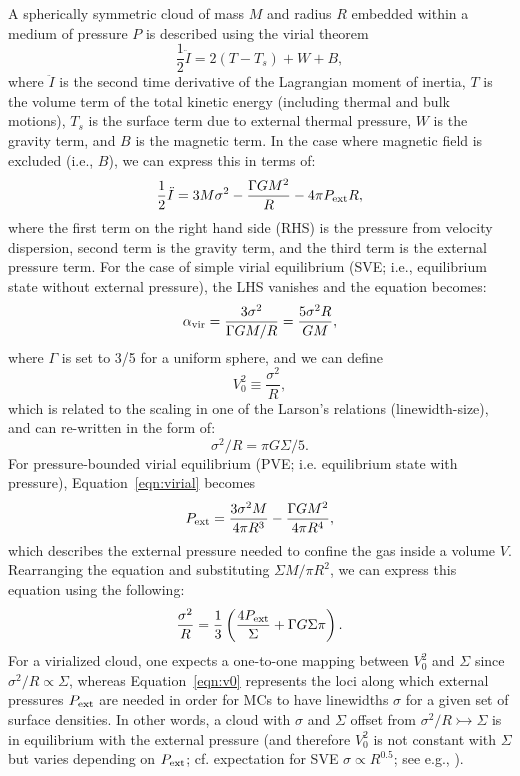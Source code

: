 \documentclass[apj]{emulateapj} %
\begin{document}
{%
A spherically symmetric cloud of mass $M$ and radius $R$ embedded within
a medium of pressure $P$ is described using the virial theorem
\begin{equation}
\frac{1}{2}\ddot I = 2(T - T_s) + W + B,
\end{equation}
where $\ddot I$ is the second time derivative of the Lagrangian moment of inertia,
$T$ is the volume term of the total kinetic energy (including thermal and
bulk motions), $T_s$ is the surface term due to external thermal pressure,
$W$ is the gravity term, and $B$ is the magnetic term.
In the case where magnetic field is excluded (i.e., $B$), we can express this in terms of:
\begin{equation}
\frac{1}{2}\ddot I = 3 M \sigma^2 - \frac{\Gamma GM^2}{R} - 4\pi P_{\rm ext} R,
\label{eqn:virial}
\end{equation}
where the first term on the right hand side (RHS) is the pressure from velocity dispersion, second
term is the gravity term, and the third term is the external pressure term.
For the case of simple virial equilibrium (SVE; i.e., equilibrium state without external pressure),
the LHS vanishes and the equation becomes:
\begin{equation}
\alpha_{\rm vir} = \frac{3\sigma^2}{\Gamma GM/R} = \frac{5\sigma^2R}{GM},
\end{equation}
where $\Gamma$ is set to 3/5 for a uniform sphere, and we can define
\begin{equation}
V_0^2\equiv\frac{\sigma^2}{R},
\end{equation}
which is related to the scaling in one of the Larson's relations (linewidth-size),
and can re-written in the form of:
\begin{equation}
\sigma^2/R = \pi G \Sigma/5.
\end{equation}
For pressure-bounded virial equilibrium (PVE; i.e. equilibrium state with pressure), Equation~\ref{eqn:virial} becomes
\begin{equation}
P_{\rm ext} = \frac{3\sigma^2M}{4\pi R^3} - \frac{\Gamma G M^2}{4\pi R^4},
\label{eqn:pext}
\end{equation}
which describes the external pressure needed to confine the gas inside a volume $V$.
Rearranging the equation and substituting $\Sigma$\eq$M/\pi R^2$, we can express
this equation using the following:
\begin{equation}
\frac{\sigma^2}{R} = \frac{1}{3}\left(\frac{4P_{\rm ext}}{\Sigma} + \Gamma G \Sigma \pi \right).
\label{eqn:v0}
\end{equation}
For a virialized cloud, one expects a one-to-one mapping between $V_0^2$ and $\Sigma$ since
$\sigma^2/R\propto\Sigma$, whereas
Equation~\ref{eqn:v0} represents the loci along which external pressures $P_{\rm ext}$ are
needed in order for MCs to have linewidths $\sigma$ for a given set of surface densities.
In other words, a cloud with $\sigma$ and $\Sigma$ offset from $\sigma^2/R\rightarrowtail\Sigma$
is in equilibrium with the external pressure (and therefore $V_0^2$ is not constant with $\Sigma$ but
varies depending on $P_{\rm ext}$; cf. expectation for SVE
$\sigma\propto R^{0.5}$; see e.g., \citealt{Heyer09a, Hughes10a, Hughes13b, Meidt13a}).


}
\end{document}
